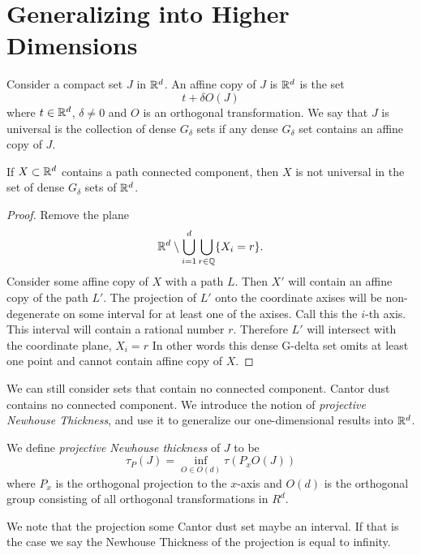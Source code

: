 \section{Generalizing into Higher Dimensions}

Consider a compact set $J$ in $\mathbb{R}^d$. An affine copy of $J$ is $\mathbb{R}^d$ is the set 
$$
t+\delta O (J)
$$
where $t\in \mathbb{R}^d$, $\delta\ne 0$ and $O$ is an orthogonal transformation. We say that $J$ is universal is the collection of dense $G_{\delta}$ sets if any dense $G_{\delta}$ set contains an affine copy of $J$. 
\begin{theorem}
    If $X\subset \mathbb{R}^d$ contains a path connected component, then $X$ is not universal in the set of dense $G_\delta$ sets of $\mathbb{R}^d$.  
\end{theorem}
\begin{proof}
    Remove the plane $$\mathbb{R}^d \setminus \bigcup_{i=1}^d \bigcup_{r \in \mathbb{Q}} \{X_i = r \}.$$
    Consider some affine copy of $X$ with a path $L$.  Then $X'$ will contain an affine copy of the path $L'$.  The projection of $L'$ onto the coordinate axises will be non-degenerate on some interval for at least one of the axises.  Call this the $i$-th axis.  This interval will contain a rational number $r$.  Therefore $L'$ will intersect with the coordinate plane, $X_i = r$ 
    In other words this dense G-delta set omits at least one point and cannot contain affine copy of $X$.  
\end{proof}
 We can still consider sets that contain no connected component.  Cantor dust contains no connected component.  We introduce the notion of \textit{projective Newhouse Thickness}, and use it to generalize our one-dimensional results into $\mathbb{R}^d$.  
\begin{definition}
    We define {\it projective Newhouse thickness} of $J$ to be 
$$
\tau_P(J) = \inf_{O\in O (d)} \tau(P_xO(J))
$$
where $P_x$ is the orthogonal projection to the $x$-axis and $O(d)$ is the orthogonal group consisting of all orthogonal transformations in $R^d$.  
\end{definition}

We note that the projection some Cantor dust set maybe an interval.  If that is the case we say the Newhouse Thickness of the projection is equal to infinity.  

